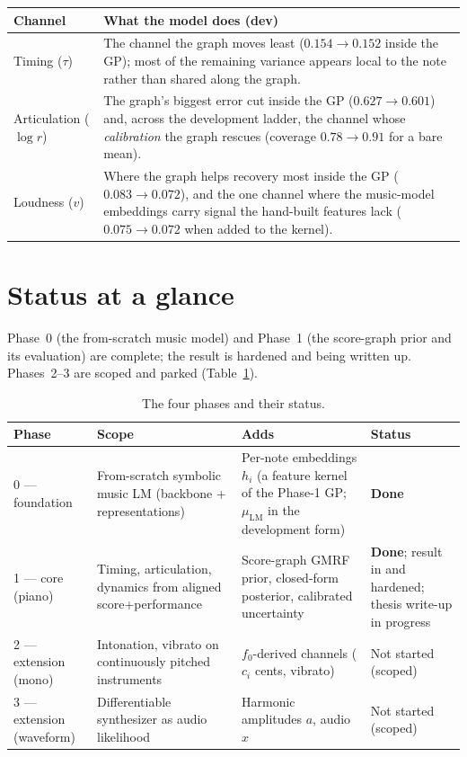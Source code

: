 \documentclass[11pt,a4paper]{report}
\newcommand{\muLM}{\mu_{\mathrm{LM}}}  %
\begin{document}
\begin{table}[h]\centering
\footnotesize
\begin{tabular}{@{}p{3.0cm}p{10.0cm}@{}}
\toprule
Channel & What the model does (dev) \\
\midrule
Timing ($\tau$) & The channel the graph moves least ($0.154 \to 0.152$ inside the
GP); most of the remaining variance appears local to the note rather than shared
along the graph. \\
Articulation ($\log r$) & The graph's biggest error cut inside the GP
($0.627 \to 0.601$) and, across the development ladder, the channel whose
\emph{calibration} the graph rescues (coverage $0.78 \to 0.91$ for a bare mean). \\
Loudness ($v$) & Where the graph helps recovery most inside the GP
($0.083 \to 0.072$), and the one channel where the music-model embeddings carry
signal the hand-built features lack ($0.075 \to 0.072$ when added to the kernel). \\
\bottomrule
\end{tabular}
\end{table}

\section{Status at a glance}
Phase~0 (the from-scratch music model) and Phase~1 (the score-graph prior and its
evaluation) are complete; the result is hardened and being written up. Phases~2--3
are scoped and parked (Table~\ref{tab:phases}).

\begin{table}[h]\centering
\caption{The four phases and their status.}
\label{tab:phases}
\footnotesize
\begin{tabular}{@{}p{1.6cm}p{4.5cm}p{4.2cm}p{3.2cm}@{}}
\toprule
Phase & Scope & Adds & Status \\
\midrule
0 --- foundation & From-scratch symbolic music LM (backbone + representations) &
Per-note embeddings $h_i$ (a feature kernel of the Phase-1 GP; $\muLM$ in the development form) & \textbf{Done} \\
1 --- core (piano) & Timing, articulation, dynamics from aligned score+performance &
Score-graph GMRF prior, closed-form posterior, calibrated uncertainty &
\textbf{Done}; result in and hardened; thesis write-up in progress \\
2 --- extension (mono) & Intonation, vibrato on continuously pitched instruments &
$f_0$-derived channels ($c_i$ cents, vibrato) & Not started (scoped) \\
3 --- extension (waveform) & Differentiable synthesizer as audio likelihood &
Harmonic amplitudes $a$, audio $x$ & Not started (scoped) \\
\bottomrule
\end{tabular}
\end{table}
\end{document}
